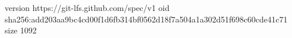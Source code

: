 version https://git-lfs.github.com/spec/v1
oid sha256:add203aa9bc4cd00f1d6fb314bf0562d18f7a504a1a302d51f698c60cde41c71
size 1092
